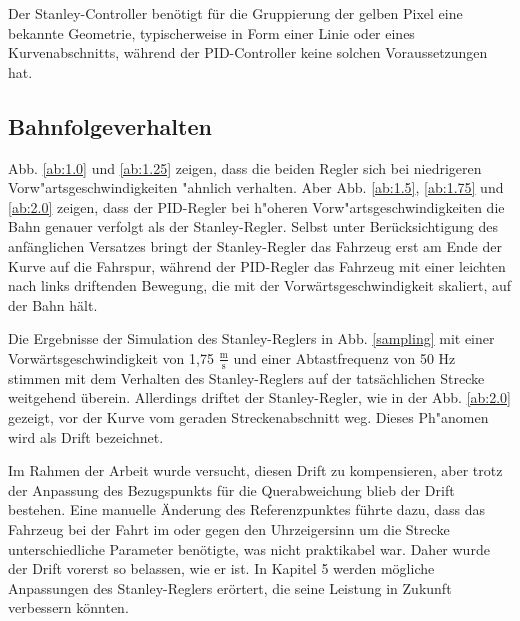 \documentclass[arbeit=studie,oneside,BCOR=12mm]{ArbeitRST}
\begin{document}
Der Stanley-Controller benötigt für die Gruppierung der gelben Pixel eine
bekannte Geometrie, typischerweise in Form einer Linie oder eines
Kurvenabschnitts, während der PID-Controller keine solchen Voraussetzungen hat.

\subsection{Bahnfolgeverhalten}

Abb. \ref{ab:1.0} und \ref{ab:1.25} zeigen, dass die beiden Regler sich bei niedrigeren
Vorw"artsgeschwindigkeiten "ahnlich verhalten. Aber Abb.
\ref{ab:1.5}, \ref{ab:1.75} und \ref{ab:2.0} zeigen, dass der PID-Regler bei
h"oheren Vorw"artsgeschwindigkeiten die Bahn genauer verfolgt als der
Stanley-Regler. Selbst unter Berücksichtigung des anfänglichen Versatzes bringt
der Stanley-Regler das Fahrzeug erst am Ende der Kurve auf die Fahrspur,
während der PID-Regler das Fahrzeug mit einer leichten nach links driftenden
Bewegung, die mit der Vorwärtsgeschwindigkeit skaliert, auf der Bahn hält.

Die Ergebnisse der Simulation des Stanley-Reglers in Abb. \ref{sampling} mit
einer Vorwärtsgeschwindigkeit von 1,75 $\frac{\mathrm{m}}{\mathrm{s}}$ und einer Abtastfrequenz von 50 Hz
stimmen mit dem Verhalten des Stanley-Reglers auf der tatsächlichen Strecke weitgehend 
überein. Allerdings driftet der Stanley-Regler, wie in der Abb. \ref{ab:2.0} gezeigt,
vor der Kurve vom geraden Streckenabschnitt weg. Dieses Ph"anomen wird als \glqq Drift
\grqq bezeichnet.

Im Rahmen der Arbeit wurde versucht, diesen Drift zu kompensieren, aber trotz der
Anpassung des Bezugspunkts für die Querabweichung blieb der Drift bestehen.
Eine manuelle Änderung des Referenzpunktes führte dazu, dass das Fahrzeug bei
der Fahrt im oder gegen den Uhrzeigersinn um die Strecke unterschiedliche
Parameter benötigte, was nicht praktikabel war. Daher wurde der Drift vorerst
so belassen, wie er ist. In Kapitel 5 werden mögliche Anpassungen des
Stanley-Reglers erörtert, die seine Leistung in Zukunft verbessern könnten.
\end{document}
